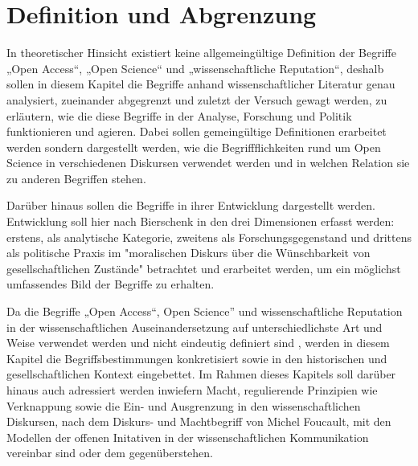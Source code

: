 \chapter{Definition und Abgrenzung} 
In theoretischer Hinsicht existiert keine allgemeingültige Definition der Begriffe „Open Access“, „Open Science“ und „wissenschaftliche Reputation“, deshalb sollen in diesem Kapitel die Begriffe anhand wissenschaftlicher Literatur genau analysiert, zueinander abgegrenzt und zuletzt der Versuch gewagt werden, zu erläutern, wie die diese Begriffe in der Analyse, Forschung und Politik funktionieren und agieren. Dabei sollen gemeingültige Definitionen erarbeitet werden sondern dargestellt werden, wie die Begriffflichkeiten rund um Open Science in verschiedenen Diskursen verwendet werden und in welchen Relation sie zu anderen Begriffen stehen.

Darüber hinaus sollen die Begriffe in ihrer Entwicklung dargestellt werden. Entwicklung soll hier nach Bierschenk in den drei Dimensionen erfasst werden: erstens, als analytische Kategorie, zweitens als Forschungsgegenstand und drittens als politische Praxis im "moralischen Diskurs über die Wünschbarkeit von gesellschaftlichen Zustände" betrachtet und erarbeitet werden, um ein möglichst umfassendes Bild der Begriffe zu erhalten. 

Da die Begriffe „Open Access“, Open Science” und wissenschaftliche Reputation in der wissenschaftlichen Auseinandersetzung auf unterschiedlichste Art und Weise verwendet werden und nicht eindeutig definiert sind \cite{cite:9}, werden in diesem Kapitel die Begriffsbestimmungen konkretisiert sowie in den historischen und gesellschaftlichen Kontext eingebettet.
Im Rahmen dieses Kapitels soll darüber hinaus auch adressiert werden inwiefern Macht, regulierende Prinzipien wie Verknappung sowie die Ein- und Ausgrenzung in den wissenschaftlichen Diskursen, nach dem Diskurs- und Machtbegriff  von Michel Foucault, mit den Modellen der offenen Initativen in der wissenschaftlichen Kommunikation vereinbar sind oder dem gegenüberstehen.

